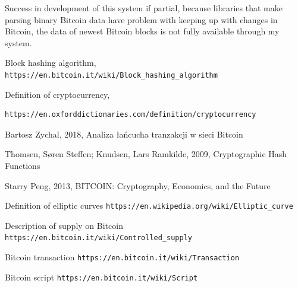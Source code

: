 \documentclass[12pt, en, eng, oneside]{mgr}
\begin{document}
Success in development of this system if partial, because libraries that make parsing binary Bitcoin data have problem with keeping up with changes in Bitcoin, the data of newest Bitcoin blocks is not fully available through my system.    
   

\begin{thebibliography}{9}
 
Block hashing algorithm,
\texttt{https://en.bitcoin.it/wiki/Block\_hashing\_algorithm}

Definition of cryptocurrency,
\begin{verbatim}
https://en.oxforddictionaries.com/definition/cryptocurrency
\end{verbatim}

Bartosz Zychal, 2018, Analiza \l{}a\'ncucha tranzakcji w sieci Bitcoin

Thomsen, Søren Steffen; Knudsen, Lars Ramkilde, 2009, Cryptographic Hash Functions

Starry Peng, 2013, BITCOIN: Cryptography, Economics, and the Future

Definition of elliptic curves
\texttt{https://en.wikipedia.org/wiki/Elliptic\_curve}

Description of supply on Bitcoin
\texttt{https://en.bitcoin.it/wiki/Controlled\_supply}

Bitcoin transaction
\texttt{https://en.bitcoin.it/wiki/Transaction}

Bitcoin script
\texttt{https://en.bitcoin.it/wiki/Script}

\end{thebibliography}
\end{document}
